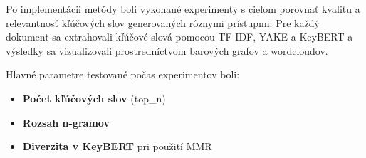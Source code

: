 \documentclass[a4paper,12pt]{article}
\begin{document}
Po implementácii metódy boli vykonané experimenty s cieľom porovnať kvalitu a relevantnosť kľúčových slov generovaných rôznymi prístupmi. Pre každý dokument sa extrahovali kľúčové slová pomocou TF-IDF, YAKE a KeyBERT a výsledky sa vizualizovali prostredníctvom barových grafov a wordcloudov.

Hlavné parametre testované počas experimentov boli:  
\begin{itemize}
    \item \textbf{Počet kľúčových slov} (top\_n)
    \item \textbf{Rozsah n-gramov}
    \item \textbf{Diverzita v KeyBERT} pri použití MMR
\end{itemize}

\end{document}
